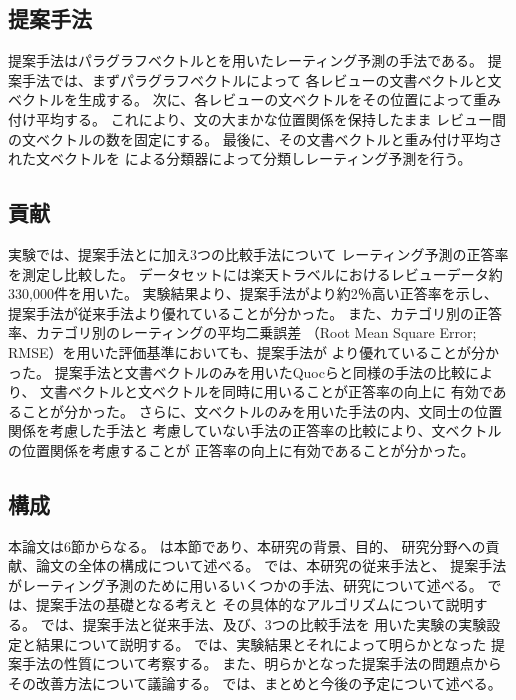 \subsection{提案手法}

提案手法はパラグラフベクトルと\nn を用いたレーティング予測の手法である。
提案手法では、まずパラグラフベクトル\cite{quoc14}によって
各レビューの文書ベクトルと文ベクトルを生成する。
次に、各レビューの文ベクトルをその位置によって重み付け平均する。
これにより、文の大まかな位置関係を保持したまま
レビュー間の文ベクトルの数を固定にする。
最後に、その文書ベクトルと重み付け平均された文ベクトルを
\nn による分類器によって分類しレーティング予測を行う。


\subsection{貢献}

実験では、提案手法と\rival に加え3つの比較手法について
レーティング予測の正答率を測定し比較した。
データセットには楽天トラベルにおけるレビューデータ約330,000件を用いた。
実験結果より、提案手法が\rival より約2％高い正答率を示し、
提案手法が従来手法より優れていることが分かった。
また、カテゴリ別の正答率、カテゴリ別のレーティングの平均二乗誤差
（Root Mean Square Error; RMSE）を用いた評価基準においても、提案手法が
\rival より優れていることが分かった。
提案手法と文書ベクトルのみを用いたQuocら\cite{quoc14}と同様の手法の比較により、
文書ベクトルと文ベクトルを同時に用いることが正答率の向上に
有効であることが分かった。
さらに、文ベクトルのみを用いた手法の内、文同士の位置関係を考慮した手法と
考慮していない手法の正答率の比較により、文ベクトルの位置関係を考慮することが
正答率の向上に有効であることが分かった。


\subsection{構成}

本論文は6節からなる。
は本節であり、本研究の背景、目的、
研究分野への貢献、論文の全体の構成について述べる。
では、本研究の従来手法\cite{fujitani15}と、
提案手法がレーティング予測のために用いるいくつかの手法、研究について述べる。
では、提案手法の基礎となる考えと
その具体的なアルゴリズムについて説明する。
では、提案手法と従来手法、及び、3つの比較手法を
用いた実験の実験設定と結果について説明する。
では、実験結果とそれによって明らかとなった
提案手法の性質について考察する。
また、明らかとなった提案手法の問題点からその改善方法について議論する。
では、まとめと今後の予定について述べる。
